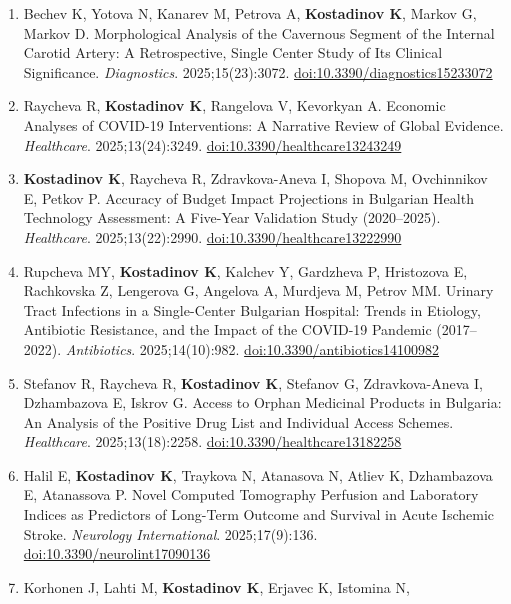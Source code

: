 \documentclass[
  10.5pt,
  a4paper,
  DIV=11,
  numbers=noendperiod]{scrartcl}
\begin{document}
\begin{enumerate}
  \href{https://doi.org/10.5272/jimab.2026321.6691}{doi:10.5272/jimab.2026321.6691}
\item
  Bechev K, Yotova N, Kanarev M, Petrova A, \textbf{Kostadinov K},
  Markov G, Markov D. Morphological Analysis of the Cavernous Segment of
  the Internal Carotid Artery: A Retrospective, Single Center Study of
  Its Clinical Significance. \emph{Diagnostics}. 2025;15(23):3072.
  \href{https://doi.org/10.3390/diagnostics15233072}{doi:10.3390/diagnostics15233072}
\item
  Raycheva R, \textbf{Kostadinov K}, Rangelova V, Kevorkyan A. Economic
  Analyses of COVID-19 Interventions: A Narrative Review of Global
  Evidence. \emph{Healthcare}. 2025;13(24):3249.
  \href{https://doi.org/10.3390/healthcare13243249}{doi:10.3390/healthcare13243249}
\item
  \textbf{Kostadinov K}, Raycheva R, Zdravkova-Aneva I, Shopova M,
  Ovchinnikov E, Petkov P. Accuracy of Budget Impact Projections in
  Bulgarian Health Technology Assessment: A Five-Year Validation Study
  (2020--2025). \emph{Healthcare}. 2025;13(22):2990.
  \href{https://doi.org/10.3390/healthcare13222990}{doi:10.3390/healthcare13222990}
\item
  Rupcheva MY, \textbf{Kostadinov K}, Kalchev Y, Gardzheva P, Hristozova
  E, Rachkovska Z, Lengerova G, Angelova A, Murdjeva M, Petrov MM.
  Urinary Tract Infections in a Single-Center Bulgarian Hospital: Trends
  in Etiology, Antibiotic Resistance, and the Impact of the COVID-19
  Pandemic (2017--2022). \emph{Antibiotics}. 2025;14(10):982.
  \href{https://doi.org/10.3390/antibiotics14100982}{doi:10.3390/antibiotics14100982}
\item
  Stefanov R, Raycheva R, \textbf{Kostadinov K}, Stefanov G,
  Zdravkova-Aneva I, Dzhambazova E, Iskrov G. Access to Orphan Medicinal
  Products in Bulgaria: An Analysis of the Positive Drug List and
  Individual Access Schemes. \emph{Healthcare}. 2025;13(18):2258.
  \href{https://doi.org/10.3390/healthcare13182258}{doi:10.3390/healthcare13182258}
\item
  Halil E, \textbf{Kostadinov K}, Traykova N, Atanasova N, Atliev K,
  Dzhambazova E, Atanassova P. Novel Computed Tomography Perfusion and
  Laboratory Indices as Predictors of Long-Term Outcome and Survival in
  Acute Ischemic Stroke. \emph{Neurology International}. 2025;17(9):136.
  \href{https://doi.org/10.3390/neurolint17090136}{doi:10.3390/neurolint17090136}
\item
  Korhonen J, Lahti M, \textbf{Kostadinov K}, Erjavec K, Istomina N,

\end{enumerate}
\end{document}

